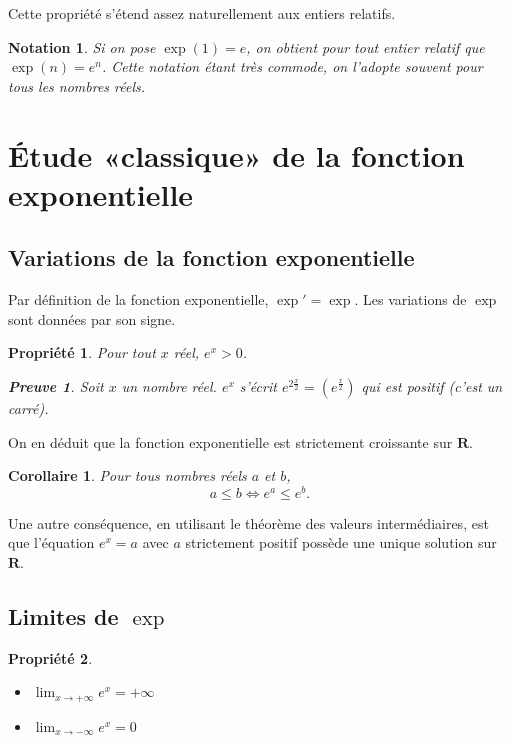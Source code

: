 \documentclass[12pt,a4paper,french]{article}
\newcommand{\R}{\mathbf{R}}
\theoremstyle{break}
\newtheorem{propriete}{Propriété}
\newtheorem{corollaire}{Corollaire}
\theoremstyle{plain}
\theoremstyle{nonumberplain}
\newtheorem{notation}{Notation}
\newtheorem{preuve}{Preuve}
\theoremstyle{nonumberbreak}
\begin{document}
Cette propriété s'étend assez naturellement aux entiers relatifs.

\begin{notation}
  Si on pose $\exp(1) = e$, on obtient pour tout entier relatif que
  $\exp(n) = e^n$. Cette notation étant très commode, on l'adopte
  souvent pour tous les nombres réels.
\end{notation}

\section{Étude «classique» de la fonction exponentielle}

\subsection{Variations de la fonction exponentielle}

Par définition de la fonction exponentielle, $\exp' = \exp$. Les
variations de $\exp$ sont données par son signe.

\begin{propriete}
  Pour tout $x$ réel, $e^x > 0$.
  \begin{preuve}
    Soit $x$ un nombre réel. $e^x$ s'écrit $e^{2\frac{x}2} =
    \left(e^{\frac{x}2}\right)$ qui est positif (c'est un carré).
  \end{preuve}
\end{propriete}

On en déduit que la fonction exponentielle est strictement croissante
sur $\R$.

\begin{corollaire}
  Pour tous nombres réels $a$ et $b$, \[ a \leqslant b \iff e^a
  \leqslant e^b.\]
\end{corollaire}

Une autre conséquence, en utilisant le théorème des valeurs
intermédiaires, est que l'équation $e^x = a$ avec $a$ strictement
positif possède une unique solution sur $\R$.

\subsection{Limites de $\exp$}

\begin{propriete}~\\[-7ex]
  \begin{multicols}{2}
    \begin{itemize}
      \item $\lim_{x\to+\infty}e^x = +\infty$
      \item $\lim_{x\to-\infty}e^{x} = 0$
    \end{itemize}
  \end{multicols}
\end{propriete}
\end{document}
